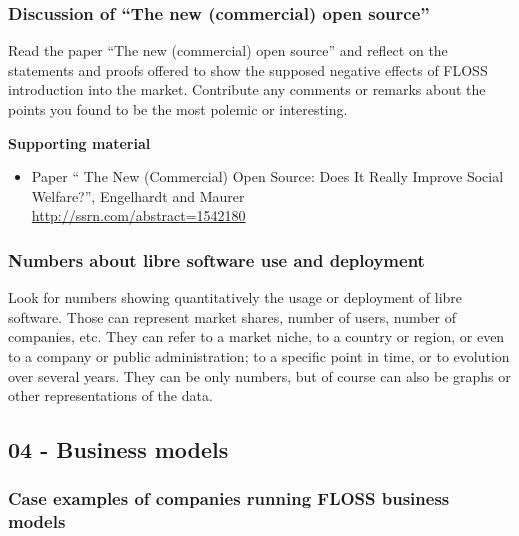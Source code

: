 \documentclass[a4paper]{article}
\begin{document}
\subsubsection{Discussion of ``The new (commercial) open source''}
\label{sub:new-oss}

Read the paper ``The new (commercial) open source'' and reflect on the statements and proofs offered to show the supposed negative effects of FLOSS introduction into the market. Contribute any comments or remarks about the points you found to be the most polemic or interesting.

\textbf{Supporting material}

\begin{itemize}
\item Paper `` The New (Commercial) Open Source: Does It Really Improve Social Welfare?'', Engelhardt and Maurer \\
  \url{http://ssrn.com/abstract=1542180}
\end{itemize}

\subsubsection{Numbers about libre software use and deployment}
\label{sub:numbers-use}

Look for numbers showing quantitatively the usage or deployment of libre software. Those can represent market shares, number of users, number of companies, etc. They can refer to a market niche, to a country or region, or even to a company or public administration; to a specific point in time, or to evolution over several years. They can be only numbers, but of course can also be graphs or other representations of the data.


\subsection{04 - Business models}

\subsubsection{Case examples of companies running FLOSS business models}
\label{sub:business-cases}
\end{document}
